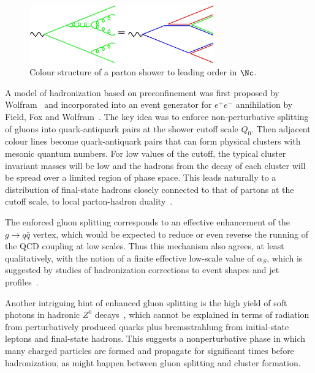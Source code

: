 \begin{figure}
\begin{center}\includegraphics[width=8cm]{hadronization/planar.jpg}\end{center}
\caption{Colour structure of a parton shower to leading order in
  $\Nc$.\label{fig:planar}}
\end{figure}

A model of hadronization based on preconfinement was first proposed by
Wolfram~\cite{Wolfram:1980gg} and incorporated into an event generator for $e^+e^-$
annihilation by Field, Fox and Wolfram~\cite{Fox:1979ag,Field:1982dg}.  The key idea
was to enforce non-perturbative splitting of gluons into
quark-antiquark pairs at the shower cutoff scale $Q_0$.  Then
adjacent colour lines become quark-antiquark pairs that can form
physical clusters with mesonic quantum numbers.  For low values of the
cutoff, the typical cluster invariant masses will be low and the hadrons
from the decay of each cluster will be spread over a limited region of
phase space.  This leads naturally to a distribution of final-state
hadrons closely connected to that of partons at the cutoff scale,
\ie to local parton-hadron duality~\cite{Azimov:1984np,Azimov:1985by}.

The enforced gluon splitting corresponds to an effective enhancement
of the $g\to q\bar q$ vertex, which would be expected to reduce or
even reverse the running of the QCD coupling at low scales.  Thus this
mechanism also agrees, at least qualitatively, with the notion of a finite
effective low-scale value of $\alpha_S$, which is suggested by studies
of hadronization corrections to event shapes\cite{Dokshitzer:1995zt,Dokshitzer:1995qm,Dasgupta:2003iq}
 and jet profiles~\cite{Dasgupta:2007wa}.
 
Another intriguing hint of enhanced gluon splitting is the high
yield of soft photons in hadronic $Z^0$ decays~\cite{Abdallah:2005wn,Abdallah:2010tk}, which cannot be
explained in terms of radiation from perturbatively produced quarks
plus bremsstrahlung from initial-state leptons and final-state hadrons.
This suggests a nonperturbative phase in which many charged particles
are formed and propagate for significant times before hadronization,
as might happen between gluon splitting and cluster formation.

